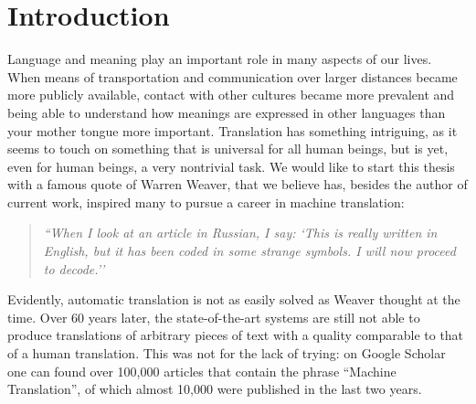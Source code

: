 \documentclass[a4paper, 11pt]{report}
\author{}
\title{}
\theoremstyle{definition}
\theoremstyle{plain}
\begin{document}
\maketitle
\tableofcontents





\chapter{Introduction}

Language and meaning play an important role in many aspects of our lives. When means of transportation and communication over larger distances became more publicly available, contact with other cultures became more prevalent and being able to understand how meanings are expressed in other languages than your mother tongue more important. Translation has something intriguing, as it seems to touch on something that is universal for all human beings, but is yet, even for human beings, a very nontrivial task. We would like to start this thesis with a famous quote of Warren Weaver, that we believe has, besides the author of current work, inspired many to pursue a career in machine translation:

\begin{quote}
\textit{``When I look at an article in Russian, I say: `This is really written in English, but it has been coded in some strange symbols. I will now proceed to decode.''} \citep{weaver1955translation}
\end{quote}

Evidently, automatic translation is not as easily solved as Weaver thought at the time. Over 60 years later, the state-of-the-art systems are still not able to produce translations of arbitrary pieces of text with a quality comparable to that of a human translation. This was not for the lack of trying: on Google Scholar one can found over 100,000 articles that contain the phrase ``Machine Translation'', of which almost 10,000 were published in the last two years.
\end{document}
